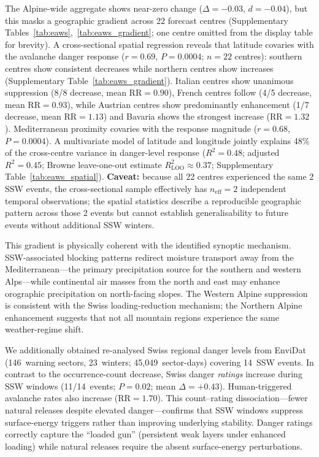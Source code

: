 \documentclass[11pt,letterpaper]{article}
\begin{document}
The Alpine-wide aggregate shows near-zero change ($\Delta = -0.03$, $d = -0.04$), but this masks a geographic gradient across 22 forecast centres (Supplementary Tables~\ref{tab:eaws},~\ref{tab:eaws_gradient}; one centre omitted from the display table for brevity). A cross-sectional spatial regression reveals that latitude covaries with the avalanche danger response ($r = 0.69$, $P = 0.0004$; $n = 22$ centres): southern centres show consistent decreases while northern centres show increases (Supplementary Table~\ref{tab:eaws_gradient}). Italian centres show unanimous suppression (8/8 decrease, mean $\mathrm{RR} = 0.90$), French centres follow (4/5 decrease, mean $\mathrm{RR} = 0.93$), while Austrian centres show predominantly enhancement (1/7 decrease, mean $\mathrm{RR} = 1.13$) and Bavaria shows the strongest increase ($\mathrm{RR} = 1.32$). Mediterranean proximity covaries with the response magnitude ($r = 0.68$, $P = 0.0004$). A multivariate model of latitude and longitude jointly explains 48\% of the cross-centre variance in danger-level response ($R^2 = 0.48$; adjusted $R^2 = 0.45$; Browne leave-one-out estimate $R^2_{\mathrm{LOO}} \approx 0.37$; Supplementary Table~\ref{tab:eaws_spatial}). \textbf{Caveat:} because all 22 centres experienced the same 2 SSW events, the cross-sectional sample effectively has $n_{\mathrm{eff}} = 2$ independent temporal observations; the spatial statistics describe a reproducible geographic pattern across those 2 events but cannot establish generalisability to future events without additional SSW winters.

This gradient is physically coherent with the identified synoptic mechanism. SSW-associated blocking patterns redirect moisture transport away from the Mediterranean---the primary precipitation source for the southern and western Alps---while continental air masses from the north and east may enhance orographic precipitation on north-facing slopes\cite{Kolstad2010}. The Western Alpine suppression is consistent with the Swiss loading-reduction mechanism; the Northern Alpine enhancement suggests that not all mountain regions experience the same weather-regime shift.

We additionally obtained re-analysed Swiss regional danger levels from EnviDat (146~warning sectors, 23~winters; 45,049~sector-days) covering 14~SSW events. In contrast to the occurrence-count decrease, Swiss danger \emph{ratings} increase during SSW windows (11/14~events; $P = 0.02$; mean $\Delta = +0.43$). Human-triggered avalanche rates also increase ($\mathrm{RR} = 1.70$). This count--rating dissociation---fewer natural releases despite elevated danger---confirms that SSW windows suppress surface-energy triggers rather than improving underlying stability. Danger ratings correctly capture the ``loaded gun'' (persistent weak layers under enhanced loading) while natural releases require the absent surface-energy perturbations.
\end{document}
